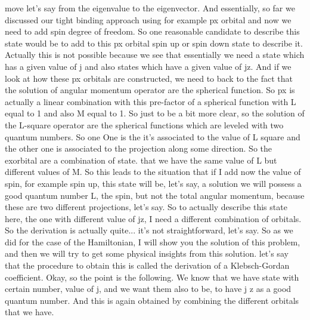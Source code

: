 move let's say from the eigenvalue to the eigenvector. And essentially, so far we discussed our tight binding approach using for example px orbital and now we need to add spin degree of freedom. So one reasonable candidate to describe this state would be to add to this px orbital spin up or spin down state to describe it. Actually this is not possible because we see that essentially we need a state which has a given value of j and also states which have a given value of jz. And if we look at how these px orbitals are constructed, we need to back to the fact that the solution of angular momentum operator are the spherical function. So px is actually a linear combination with this pre-factor of a spherical function with L equal to 1 and also M equal to 1. So just to be a bit more clear, so the solution of the L-square operator are the spherical functions which are leveled with two quantum numbers. So one One is the it's associated to the value of L square and the other one is associated to the projection along some direction. So the exorbital are a combination of state. that we have the same value of L but different values of M. So this leads to the situation that if I add now the value of spin, for example spin up, this state will be, let's say, a solution we will possess a good quantum number L, the spin, but not the total angular momentum, because these are two different projections, let's say. So to actually describe this state here, the one with different value of jz, I need a different combination of orbitals. So the derivation is actually quite... it's not straightforward, let's say. So as we did for the case of the Hamiltonian, I will show you the solution of this problem, and then we will try to get some physical insights from this solution. let's say that the procedure to obtain this is called the derivation of a Klebsch-Gordan coefficient. Okay, so the point is the following. We know that we have state with certain number, value of j, and we want them also to be, to have j z as a good quantum number. And this is again obtained by combining the different orbitals that we have.
